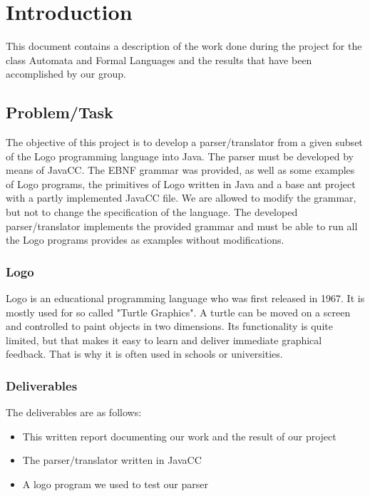 \chapter{Introduction}
\label{chap:introduction}

This document contains a description of the work done during the project for the class Automata and Formal Languages and the results that have been accomplished by our group.

\section{Problem/Task}
\label{sec:problem_task}

The objective of this project is to develop a parser/translator from a given subset of the Logo programming language into Java. The parser must be developed by means of JavaCC. The EBNF grammar was provided, as well as some examples of Logo programs, the primitives of Logo written in Java and a base ant project with a partly implemented JavaCC file. We are allowed to modify the grammar, but not to change the specification of the language. The developed parser/translator implements the provided grammar and must be able to run all the Logo programs provides as examples without modifications.

\subsection{Logo}
\label{sec:logo}

Logo is an educational programming language who was first released in 1967. It is mostly used for so called "Turtle Graphics". A turtle can be moved on a screen and controlled to paint objects in two dimensions. Its functionality is quite limited, but that makes it easy to learn and deliver immediate graphical feedback. That is why it is often used in schools or universities.

\subsection{Deliverables}
\label{sec:deliverables}

The deliverables are as follows:

\begin{itemize}
\item This written report documenting our work and the result of our project
\item The parser/translator written in JavaCC
\item A logo program we used to test our parser
\end{itemize}


